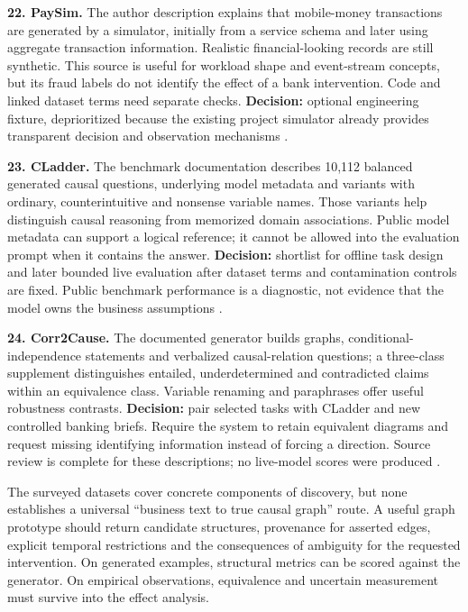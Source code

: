 \textbf{22. PaySim.} The author description explains that mobile-money
transactions are generated by a simulator, initially from a service
schema and later using aggregate transaction information. Realistic
financial-looking records are still synthetic. This source is useful for
workload shape and event-stream concepts, but its fraud labels do not
identify the effect of a bank intervention. Code and linked dataset
terms need separate checks. \textbf{Decision:} optional engineering
fixture, deprioritized because the existing project simulator already
provides transparent decision and observation mechanisms
\citep{pd15_paysim_pinned}.

\textbf{23. CLadder.} The benchmark documentation describes 10,112
balanced generated causal questions, underlying model metadata and
variants with ordinary, counterintuitive and nonsense variable names.
Those variants help distinguish causal reasoning from memorized domain
associations. Public model metadata can support a logical reference; it
cannot be allowed into the evaluation prompt when it contains the
answer. \textbf{Decision:} shortlist for offline task design and later
bounded live evaluation after dataset terms and contamination controls
are fixed. Public benchmark performance is a diagnostic, not evidence
that the model owns the business assumptions
\citep{pd15_cladder_pinned}.

\textbf{24. Corr2Cause.} The documented generator builds graphs,
conditional-independence statements and verbalized causal-relation
questions; a three-class supplement distinguishes entailed,
underdetermined and contradicted claims within an equivalence class.
Variable renaming and paraphrases offer useful robustness contrasts.
\textbf{Decision:} pair selected tasks with CLadder and new controlled
banking briefs. Require the system to retain equivalent diagrams and
request missing identifying information instead of forcing a direction.
Source review is complete for these descriptions; no live-model scores
were produced \citep{pd15_corr2cause_pinned}.

The surveyed datasets cover concrete components of discovery, but none
establishes a universal ``business text to true causal graph'' route. A
useful graph prototype should return candidate structures, provenance
for asserted edges, explicit temporal restrictions and the consequences
of ambiguity for the requested intervention. On generated examples,
structural metrics can be scored against the generator. On empirical
observations, equivalence and uncertain measurement must survive into
the effect analysis.

